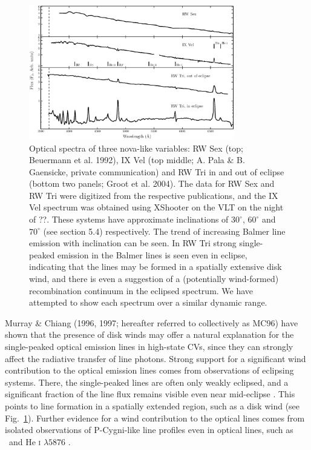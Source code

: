 \documentclass[preprint, a4paper, 11pt]{aastex}
\begin{document}
\begin{figure}	%
\centering
\includegraphics[width=0.8\textwidth]{figures/fig1.eps}
\caption{
Optical spectra of three nova-like variables: 
RW Sex (top; Beuermann et al. 1992),
IX Vel (top middle; A. Pala \& B. Gaensicke, private communication) 
and RW Tri in and out of eclipse (bottom two panels; Groot et al. 2004).
The data for RW Sex and RW Tri were digitized from the respective publications,
and the IX Vel spectrum was obtained using XShooter on the VLT on the night of ??.
These systems have approximate inclinations of $30^\circ$, $60^\circ$ and $70^\circ$ 
(see section 5.4) respectively. 
The trend of increasing Balmer line emission with inclination can be seen.
In RW Tri strong single-peaked emission in the Balmer lines is seen even
in eclipse, indicating that the lines may be formed in a spatially
extensive disk wind, and there is even a suggestion 
of a (potentially wind-formed) recombination continuum in the eclipsed
spectrum. We have attempted to show each spectrum over a similar dynamic range.
}
\label{novalikes}
\end{figure}

Murray \& Chiang (1996, 1997; hereafter referred to collectively as MC96)\nocite{MC96, MC97} 
have shown that the presence of disk winds may
offer a natural explanation for the single-peaked optical emission lines in
high-state CVs, since they can strongly affect the radiative transfer
of line photons. Strong support for a significant wind contribution to the
optical emission lines comes from observations of eclipsing
systems. There, the single-peaked lines are often only weakly
eclipsed, and a significant fraction of the line flux remains visible
even near mid-eclipse \citep[e.g.][]{baptista2000,groot2004}. 
This points to line formation in a spatially
extended region, such as a disk wind (see Fig.~\ref{novalikes}).
Further evidence for a wind contribution to the optical lines comes
from isolated observations of P-Cygni-like line profiles even in optical
lines, such as \ha\ and He \textsc{i} $\lambda5876$ \citep{patterson1996, RN98, kafka2004}.
\end{document}

